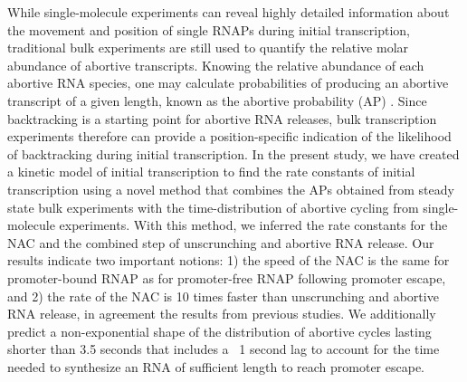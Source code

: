 While single-molecule experiments can reveal highly detailed information
about the movement and position of single RNAPs during initial transcription,
traditional bulk experiments are still used to quantify the relative molar
abundance of abortive transcripts. Knowing the relative abundance of each
abortive RNA species, one may calculate probabilities of producing an
abortive transcript of a given length, known as the abortive probability
(AP) \cite{hsu_promoter_2002, hsu_quantitative_1996}. Since backtracking is a
starting point for abortive RNA releases, bulk transcription experiments
therefore can provide a position-specific indication of the likelihood of
backtracking during initial transcription. In the present study, we have
created a kinetic model of initial transcription to find the rate constants of
initial transcription using a novel method that combines the APs obtained from
steady state bulk experiments with the time-distribution of abortive cycling
from single-molecule experiments. With this method, we inferred the rate
constants for the NAC and the combined step of unscrunching and abortive RNA
release. Our results indicate two important notions: 1) the speed of the NAC
is the same for promoter-bound RNAP as for promoter-free RNAP following
promoter escape, and 2) the rate of the NAC is 10 times faster than
unscrunching and abortive RNA release, in agreement the results from previous
studies. We additionally predict a non-exponential shape of the distribution
of abortive cycles lasting shorter than 3.5 seconds that includes a ~1 second
lag to account for the time needed to synthesize an RNA of sufficient length
to reach promoter escape.
